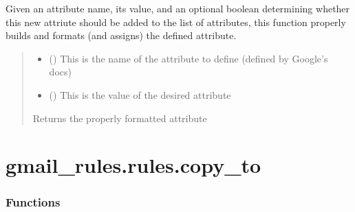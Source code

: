 \documentclass[letterpaper,10pt,english]{sphinxmanual}
\begin{document}
\begin{fulllineitems}
\begin{fulllineitems}
\label{\detokenize{_autosummary/gmail_rules.rules.rule:gmail_rules.rules.rule.Rule.xml_format_rule_attribute}}
\pysigstartsignatures
{}
\pysigstopsignatures
\sphinxAtStartPar
Given an attribute name, its value, and an optional boolean determining whether this
new attriute should be added to the list of attributes, this function properly builds
and formats (and assigns) the defined attribute.
\begin{quote}\begin{description}
\begin{itemize}
\item {} 
\sphinxAtStartPar
{} () \textendash{} This is the name of the attribute to define (defined by Google’s docs)

\item {} 
\sphinxAtStartPar
{} () \textendash{} This is the value of the desired attribute

\end{itemize}

\sphinxAtStartPar
{} \textendash{} Returns the properly formatted attribute

\sphinxAtStartPar
{}

\end{description}\end{quote}

\end{fulllineitems}


\end{fulllineitems}


\sphinxstepscope


\section{gmail\_rules.rules.copy\_to}
\label{\detokenize{_autosummary/gmail_rules.rules.copy_to:module-gmail_rules.rules.copy_to}}\label{\detokenize{_autosummary/gmail_rules.rules.copy_to:gmail-rules-rules-copy-to}}\label{\detokenize{_autosummary/gmail_rules.rules.copy_to::doc}}\subsubsection*{Functions}
\end{document}
